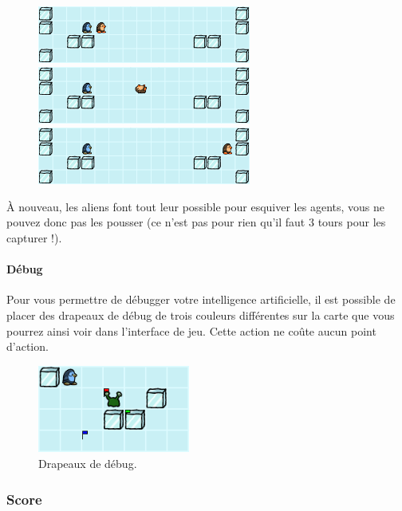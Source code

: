 \begin{figure}[!h]
    \centering
    \includegraphics[width=7cm]{img/push1}

    \vspace{0.5cm}
    \includegraphics[width=7cm]{img/push2}

    \vspace{0.5cm}
    \includegraphics[width=7cm]{img/push3}
\end{figure}

À nouveau, les aliens font tout leur possible pour esquiver les agents,
vous ne pouvez donc pas les pousser (ce n'est pas pour rien qu'il faut 3
tours pour les capturer !).

\paragraph{Débug}\label{duxe9bug}

Pour vous permettre de débugger votre intelligence artificielle, il est
possible de placer des drapeaux de débug de trois couleurs différentes
sur la carte que vous pourrez ainsi voir dans l'interface de jeu. Cette
action ne coûte aucun point d'action.

\begin{figure}[!h]
    \centering
    \includegraphics[width=5cm]{img/debug_flags}
    \caption*{Drapeaux de débug.}
\end{figure}

\subsubsection{Score}\label{score}

